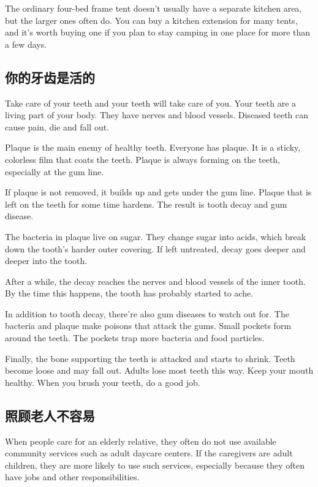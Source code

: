 The ordinary four-bed frame tent doesn't usually have a
separate kitchen area, but the larger ones often do. 
You can buy a kitchen extension for many tents, and it's
worth buying one if you plan to stay camping in one place
for more than a few days.
\subsection{你的牙齿是活的}
\begin{margintable}\vspace{-2cm}\footnotesize
\end{margintable}
Take care of your teeth and your teeth will take care of
you. Your teeth are a living part of your body. They
have nerves and blood vessels. Diseased teeth can cause
pain, die and fall out.

Plaque is the main enemy of healthy teeth. Everyone
has plaque. It is a sticky, colorless film that coats the teeth.
Plaque is always forming on the teeth, especially at the
gum line.

If plaque is not removed, it builds up and gets under the
gum line. Plaque that is left on the teeth for some time
hardens. The result is tooth decay and gum disease.

The bacteria in plaque live on sugar. They change
sugar into acids, which break down the tooth's harder
outer covering. If left untreated, decay goes deeper and
deeper into the tooth.

After a while, the decay reaches the nerves and blood
vessels of the inner tooth. By the time this happens, the
tooth has probably started to ache.

In addition to tooth decay, there're also gum diseases
to watch out for. The bacteria and plaque make
poisons that attack the gums. Small pockets form around
the teeth. The pockets trap more bacteria and food particles.

Finally, the bone supporting the teeth is attacked and
starts to shrink. Teeth become loose and may fall out.
Adults lose most teeth this way. Keep your mouth
healthy. When you brush your teeth, do a good job.

\subsection{照顾老人不容易}
\begin{margintable}\vspace{-2cm}\footnotesize
\end{margintable}
When people care for an elderly relative, they often do not
use available community services such as adult daycare
centers. If the caregivers are adult children, they are more
likely to use such services, especially because they
often have jobs and other responsibilities.

